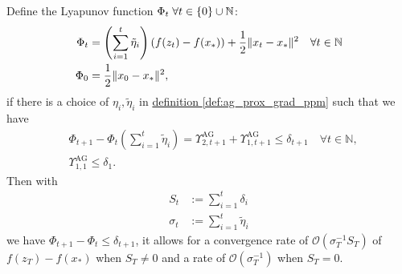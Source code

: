 \documentclass[12pt]{article}
\begin{document}
    \begin{theorem}
    \label{thm:generic_ag_convergence}
        Define the Lyapunov function $\Phi_t\; \forall t \in \{0\}\cup \mathbb N$: 
        \begin{align*}
            \Phi_t &= \left(
                \sum_{i = 1}^{t} \tilde\eta_{i}
            \right) (f(z_t) - f(x_*)) + \frac{1}{2}\Vert x_t - x_*\Vert^2 \quad \forall t \in \mathbb N
            \\
            \Phi_0 &= \frac{1}{2}\Vert x_0 - x_*\Vert^2, 
        \end{align*}
        if there is a choice of $\eta_i, \tilde \eta_i$ in 
        \hyperref[def:ag_prox_grad_ppm]{definition \ref*{def:ag_prox_grad_ppm}} such that we have 
        \begin{align*}
            & \Phi_{t + 1} - \Phi_{t}\left(
                \sum_{i = 1}^{t} \tilde \eta_i
            \right) =
            \Upsilon_{2, t + 1}^{\text{AG}} + 
            \Upsilon_{1, t + 1}^{\text{AG}} 
            \le \delta_{t + 1} \quad 
            \forall t \in \mathbb N, 
            \\
            & \Upsilon_{1, 1}^{\text{AG}} \le \delta_1. 
        \end{align*}
        Then with
        \begin{align*}
            S_t &:= \sum_{i = 1}^{t} \delta_i
            \\
            \sigma_t &:= \sum_{i = 1}^{t}\tilde \eta_i
        \end{align*}
        we have $\Phi_{t + 1} - \Phi_t \le \delta_{t + 1}$, it allows for a convergence rate of $\mathcal O \left(\sigma_T^{-1}S_T\right)$ of $f(z_T) - f(x_*)$ when $S_T \neq 0$ and a rate of $\mathcal O(\sigma_T^{-1})$ when $S_T = 0$. 
    \end{theorem}
\end{document}
